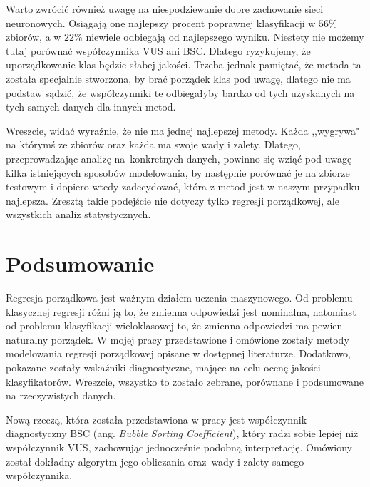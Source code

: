 \documentclass{mini}
\begin{document}
Warto zwrócić również uwagę na niespodziewanie dobre zachowanie sieci neuronowych. Osiągają one najlepszy procent poprawnej klasyfikacji w $56\%$ zbiorów, a w $22\%$ niewiele odbiegają od najlepszego wyniku. Niestety nie możemy tutaj porównać współczynnika VUS ani BSC. Dlatego ryzykujemy, że uporządkowanie klas będzie słabej jakości. Trzeba jednak pamiętać, że metoda ta została specjalnie stworzona, by brać porządek klas pod uwagę, dlatego nie ma podstaw sądzić, że współczynniki te odbiegałyby bardzo od tych uzyskanych na tych samych danych dla innych metod. 

Wreszcie, widać wyraźnie, że nie ma jednej najlepszej metody. Każda ,,wygrywa" na którymś ze zbiorów oraz każda ma swoje wady i zalety. Dlatego, przeprowadzając analizę na~konkretnych danych, powinno się wziąć pod uwagę kilka istniejących sposobów modelowania, by następnie porównać je na zbiorze testowym i dopiero wtedy zadecydować, która z metod jest w naszym przypadku najlepsza. Zresztą takie podejście nie dotyczy tylko regresji porządkowej, ale wszystkich analiz statystycznych.




\chapter*{Podsumowanie}

Regresja porządkowa jest ważnym działem uczenia maszynowego. Od problemu klasycznej regresji różni ją to, że zmienna odpowiedzi jest nominalna, natomiast od problemu klasyfikacji wieloklasowej to, że zmienna odpowiedzi ma pewien naturalny porządek. W mojej pracy przedstawione i omówione zostały metody modelowania regresji porządkowej opisane w dostępnej literaturze. Dodatkowo, pokazane zostały wskaźniki diagnostyczne, mające na celu ocenę jakości klasyfikatorów. Wreszcie, wszystko to zostało zebrane, porównane i podsumowane na rzeczywistych danych.

Nową rzeczą, która została przedstawiona w pracy jest współczynnik diagnostyczny BSC (ang. \textit{Bubble Sorting Coefficient}), który radzi sobie lepiej niż współczynnik VUS, zachowując jednocześnie podobną interpretację. Omówiony został dokładny algorytm jego obliczania oraz~wady i zalety samego współczynnika. 
\end{document}
